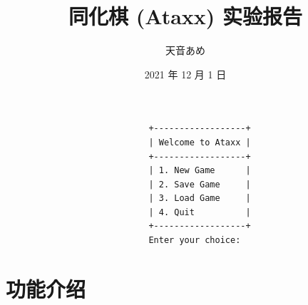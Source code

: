 \documentclass[12pt]{article}
\begin{document}
\title{同化棋 (Ataxx) 实验报告}
\author{天音あめ}
\date{2021 年 12 月 1 日}

\maketitle

\begin{verbatim}
                            +------------------+
                            | Welcome to Ataxx |
                            +------------------+
                            | 1. New Game      |
                            | 2. Save Game     |
                            | 3. Load Game     |
                            | 4. Quit          |
                            +------------------+
                            Enter your choice: 
\end{verbatim}

\newpage

\section{功能介绍}
\end{document}
